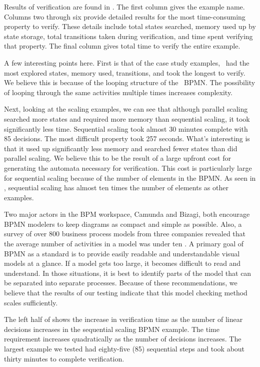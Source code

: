 Results of verification are found in . The first column gives the example name. Columns two through six provide detailed results for the most time-consuming property to verify. These details include total states searched, memory used up by state storage, total transitions taken during verification, and time spent verifying that property. The final column gives total time to verify the entire example.

A few interesting points here. First is that of the case study examples, \phware~had the most explored states, memory used, transitions, and took the longest to verify. We believe this is because of the looping structure of the \phware~BPMN. The possibility of looping through the same activities multiple times increases complexity.

Next, looking at the scaling examples, we can see that although parallel scaling searched more states and required more memory than sequential scaling, it took significantly less time. Sequential scaling took almost 30 minutes complete with 85 decisions. The most difficult property took 257 seconds.  What's interesting is that it used up significantly less memory and searched fewer states than did parallel scaling. We believe this to be the result of a large upfront cost for generating the automata necessary for verification. This cost is particularly large for sequential scaling because of the number of elements in the BPMN. As seen in , sequential scaling has almost ten times the number of elements as other examples.

Two major actors in the BPM workspace, Camunda \cite{Camunda} and Bizagi\cite{Bizagi}, both encourage BPMN modelers to keep diagrams as compact and simple as possible. Also, a survey of over 800 business process models from three companies revealed that the average number of activities in a model was under ten \cite{BPMSizes}. A primary goal of BPMN as a standard is to provide easily readable and understandable visual models at a glance. If a model gets too large, it becomes difficult to read and understand. In those situations, it is best to identify parts of the model that can be separated into separate processes. Because of these recommendations, we believe that the results of our testing indicate that this model checking method scales sufficiently.

The left half of  shows the increase in verification time as the number of linear decisions increases in the sequential scaling BPMN example. The time requirement increases quadratically as the number of decisions increases. The largest example we tested had eighty-five (85) sequential steps and took about thirty minutes to complete verification.

